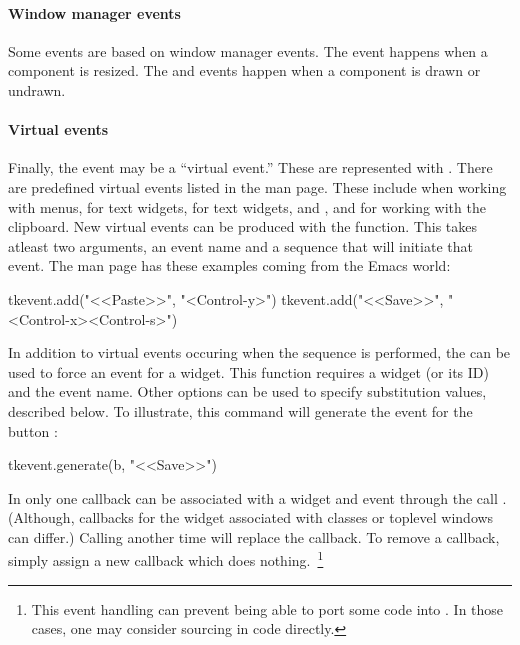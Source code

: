 \paragraph{Window manager events}
Some events are based on window manager events. The 
event happens when a component is resized. The  and
 events happen when a component is drawn or undrawn.

\paragraph{Virtual events}
Finally, the event may be a ``virtual event.'' These are represented
with . There are predefined virtual
events listed in the  man page. These include
 when working with menus,
 for text widgets,
 for text widgets, and
,  and
 for working with the clipboard. New
virtual events can be produced with the 
function. This takes atleast two arguments, an event name and a
sequence that will initiate that event. The  man page has
these examples coming from the Emacs world:
\begin{Schunk}
\begin{Sinput}
  tkevent.add("<<Paste>>", "<Control-y>")
  tkevent.add("<<Save>>", "<Control-x><Control-s>")
\end{Sinput}
\end{Schunk}
%
In addition to virtual events occuring when the sequence is performed,
the  can be used to force an event for a
widget. This function requires a widget (or its ID) and the event
name. Other options can be used to specify substitution values,
described below. To illustrate, this command will generate the
 event for the button :
\begin{Schunk}
\begin{Sinput}
 tkevent.generate(b, "<<Save>>")
\end{Sinput}
\end{Schunk}
%


In  only one callback can be associated with a widget and
event through the call
. (Although, callbacks for the
widget associated with classes or toplevel windows can differ.)
Calling  another time will replace the callback. To
remove a callback, simply assign a new callback which does
nothing.~\footnote{This event handling can prevent being able to port
  some \Tk\/ code into . In those cases, one may consider
  sourcing in \Tcl\/ code directly.}



